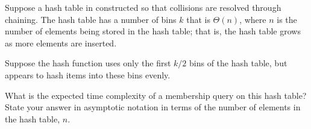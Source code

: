 \begin{prob}
    Suppose a hash table in constructed so that collisions are resolved through chaining. The hash
    table has a number of bins $k$ that is $\Theta(n)$, where $n$ is the number of elements being
    stored in the hash table; that is, the hash table grows as more elements are inserted.

    Suppose the hash function uses only the first $k / 2$ bins of the hash table, but appears to
    hash items into these bins evenly.

    What is the expected time complexity of a membership query on
    this hash table? State your answer in asymptotic notation in terms of the
    number of elements in the hash table, $n$.


\end{prob}
